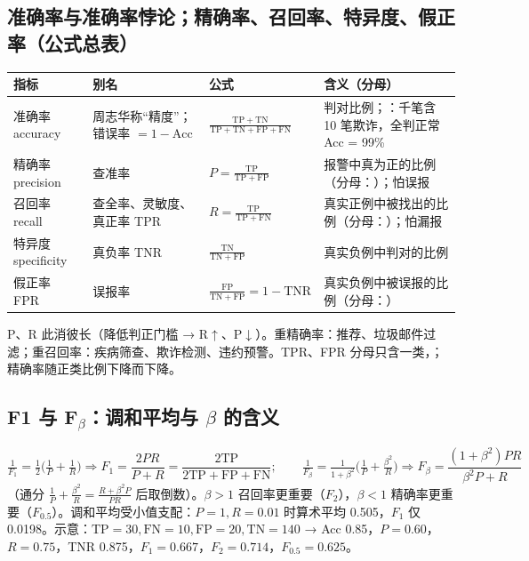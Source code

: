 \subsection{准确率与准确率悖论；精确率、召回率、特异度、假正率（公式总表）}
\begin{center}\small\renewcommand{\arraystretch}{1.1}
\begin{tabularx}{\linewidth}{@{}p{2.8cm}p{3.6cm}p{2.9cm}L@{}}
\toprule
指标 & 别名 & 公式 & 含义（分母）\\
\midrule
准确率 accuracy & 周志华称“精度”；错误率 $=1-\mathrm{Acc}$ & $\frac{\mathrm{TP}+\mathrm{TN}}{\mathrm{TP}+\mathrm{TN}+\mathrm{FP}+\mathrm{FN}}$ & 判对比例；：千笔含 10 笔欺诈，全判正常 Acc = 99\% \\
精确率 precision & 查准率 & $P=\frac{\mathrm{TP}}{\mathrm{TP}+\mathrm{FP}}$ & 报警中真为正的比例（分母：）；怕误报 \\
召回率 recall & 查全率、灵敏度、真正率 TPR & $R=\frac{\mathrm{TP}}{\mathrm{TP}+\mathrm{FN}}$ & 真实正例中被找出的比例（分母：）；怕漏报 \\
特异度 specificity & 真负率 TNR & $\frac{\mathrm{TN}}{\mathrm{TN}+\mathrm{FP}}$ & 真实负例中判对的比例 \\
假正率 FPR & 误报率 & $\frac{\mathrm{FP}}{\mathrm{TN}+\mathrm{FP}}=1-\mathrm{TNR}$ & 真实负例中被误报的比例（分母：）\\
\bottomrule
\end{tabularx}
\end{center}
P、R 此消彼长（降低判正门槛 → R$\uparrow$、P$\downarrow$）。重精确率：推荐、垃圾邮件过滤；重召回率：疾病筛查、欺诈检测、违约预警。TPR、FPR 分母只含一类，；精确率随正类比例下降而下降。

\subsection{\texorpdfstring{F1 与 F$_\beta$}{F1 与 F-beta}：调和平均与 \texorpdfstring{$\beta$}{beta} 的含义}
\[
\tfrac1{F_1}=\tfrac12\big(\tfrac1P+\tfrac1R\big)\Rightarrow F_1=\frac{2PR}{P+R}=\frac{2\mathrm{TP}}{2\mathrm{TP}+\mathrm{FP}+\mathrm{FN}};\qquad
\tfrac1{F_\beta}=\tfrac1{1+\beta^2}\big(\tfrac1P+\tfrac{\beta^2}R\big)\Rightarrow F_\beta=\frac{(1+\beta^2)PR}{\beta^2P+R}
\]
（通分 $\frac1P+\frac{\beta^2}R=\frac{R+\beta^2P}{PR}$ 后取倒数）。$\beta>1$ 召回率更重要（$F_2$），$\beta<1$ 精确率更重要（$F_{0.5}$）。调和平均受小值支配：$P=1,R=0.01$ 时算术平均 0.505，$F_1$ 仅 0.0198。示意：$\mathrm{TP}=30,\mathrm{FN}=10,\mathrm{FP}=20,\mathrm{TN}=140$ → Acc 0.85，$P=0.60$，$R=0.75$，TNR 0.875，$F_1=0.667$，$F_2=0.714$，$F_{0.5}=0.625$。

